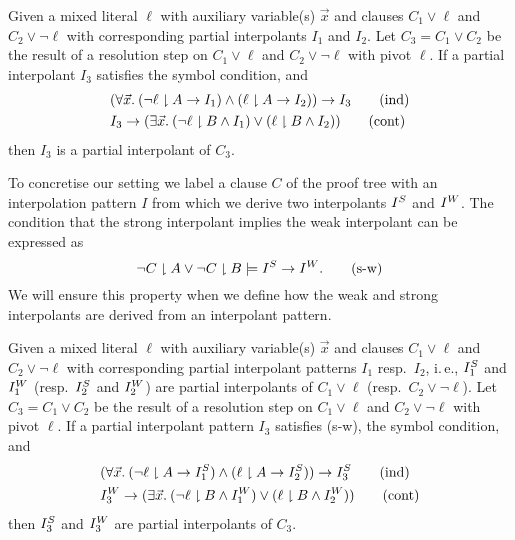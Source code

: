 \begin{techreport}
  \ifnewinterpolation
  \begin{lemma}\label{lem:weakstrongip}
    Given a mixed literal $\ell$ with auxiliary variable(s) $\vec x$
    and clauses $C_1\lor\ell$ and $C_2\lor\lnot\ell$ with corresponding 
    partial interpolants $I_1$ and $I_2$.  Let $C_3=C_1\lor C_2$ 
    be the result of a resolution step
    on $C_1\lor\ell$ and $C_2\lor\lnot\ell$ with pivot $\ell$.
    If a partial interpolant $I_3$ satisfies the symbol
    condition, and
    \begin{align*}
      &(\forall \vec x.\: (\lnot \ell \proj A \rightarrow I_1)  \land 
      (\ell \proj A \rightarrow I_2)) \rightarrow I_3 \tag{ind}\\
%
      &I_3 \rightarrow (\exists \vec x.\:
      (\lnot \ell \proj B \land I_1)  \lor
      (\ell \proj B \land I_2)) \tag{cont}
    \end{align*}
    then $I_3$ is a partial interpolant of $C_3$.
  \end{lemma}
  \else
  To concretise our setting we label a clause $C$ of the proof tree with an
  interpolation pattern $I$ from which we derive two interpolants $I\S$ and
  $I\W$.  The condition that the strong interpolant implies the weak
  interpolant can be expressed as
  \[ \lnot C\proj A \lor \lnot C\proj B \models I\S \rightarrow I\W.
  \tag{s-w}\]
  We will ensure this property when we define how the weak and strong
  interpolants are derived from an interpolant pattern.
  
  \begin{lemma}\label{lem:weakstrongip}
    Given a mixed literal $\ell$ with auxiliary variable(s) $\vec x$
    and clauses $C_1\lor\ell$ and $C_2\lor\lnot\ell$ with corresponding 
    partial interpolant patterns $I_1$ resp.\ $I_2$, i.\,e., $I_1\S$ and
    $I_1\W$ (resp.\ $I_2\S$ and $I_2\W$) are partial interpolants of
    $C_1\lor \ell$ (resp.\ $C_2\lor\lnot\ell$).  Let $C_3=C_1\lor C_2$ 
    be the result of a resolution step
    on $C_1\lor\ell$ and $C_2\lor\lnot\ell$ with pivot $\ell$.
    If a partial interpolant pattern $I_3$ satisfies (s-w), the symbol
    condition, and
    \begin{align*}
      &(\forall \vec x.\: (\lnot \ell \proj A \rightarrow I_1\S)  \land 
      (\ell \proj A \rightarrow I_2\S)) \rightarrow I\S_3 \tag{ind}\\
%
      &I_3\W \rightarrow (\exists \vec x.\:
      (\lnot \ell \proj B \land I_1\W)  \lor
      (\ell \proj B \land I_2\W)) \tag{cont}
    \end{align*}
    then $I_3\S$ and $I_3\W$ are partial interpolants of $C_3$.
  \end{lemma}
  \fi


\end{techreport}

